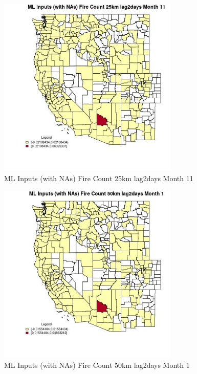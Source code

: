 \begin{figure} 
\centering  
\includegraphics[width=0.77\textwidth]{Code_Outputs/Report_ML_input_PM25_Step4_part_e_de_duplicated_aves_compiled_2019-05-20wNAs_CountyFire_Count_25km_lag2daysmedianMonth11.jpg} 
\caption{\label{fig:Report_ML_input_PM25_Step4_part_e_de_duplicated_aves_compiled_2019-05-20wNAsCountyFire_Count_25km_lag2daysmedianMonth11}ML Inputs (with NAs) Fire Count 25km lag2days Month 11} 
\end{figure} 
 

\begin{figure} 
\centering  
\includegraphics[width=0.77\textwidth]{Code_Outputs/Report_ML_input_PM25_Step4_part_e_de_duplicated_aves_compiled_2019-05-20wNAs_CountyFire_Count_50km_lag2daysmedianMonth1.jpg} 
\caption{\label{fig:Report_ML_input_PM25_Step4_part_e_de_duplicated_aves_compiled_2019-05-20wNAsCountyFire_Count_50km_lag2daysmedianMonth1}ML Inputs (with NAs) Fire Count 50km lag2days Month 1} 
\end{figure} 
 

